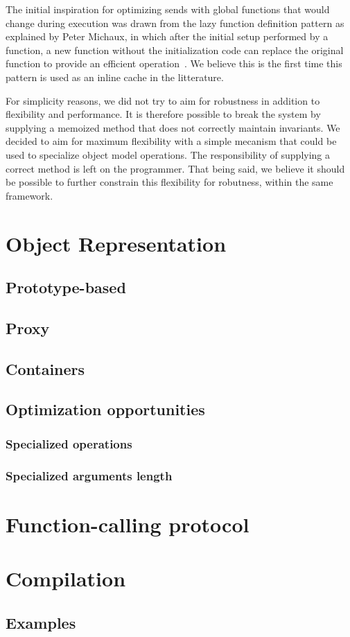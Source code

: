 The initial inspiration for optimizing sends with global functions that would
change during execution was drawn from the lazy function definition pattern as
explained by Peter Michaux, in which after the initial setup performed by a
function, a new function without the initialization code can replace the
original function to provide an efficient
operation~\cite{michaux:LazyFunctionDefinitionPattern}. We believe this is the
first time this pattern is used as an inline cache in the litterature.

For simplicity reasons, we did not try to aim for robustness in addition to
flexibility and performance. It is therefore possible to break the system by
supplying a memoized method that does not correctly maintain invariants. We
decided to aim for maximum flexibility with a simple mecanism that could be
used to specialize object model operations. The responsibility of supplying a
correct method is left on the programmer. That being said, we believe it should
be possible to further constrain this flexibility for robutness, within the
same framework.

\section{Object Representation}
\subsection{Prototype-based}
\subsection{Proxy}
\subsection{Containers}
\subsection{Optimization opportunities}
\subsubsection{Specialized operations}
\subsubsection{Specialized arguments length}

\section{Function-calling protocol}



\section{Compilation}
\subsection{Examples}

